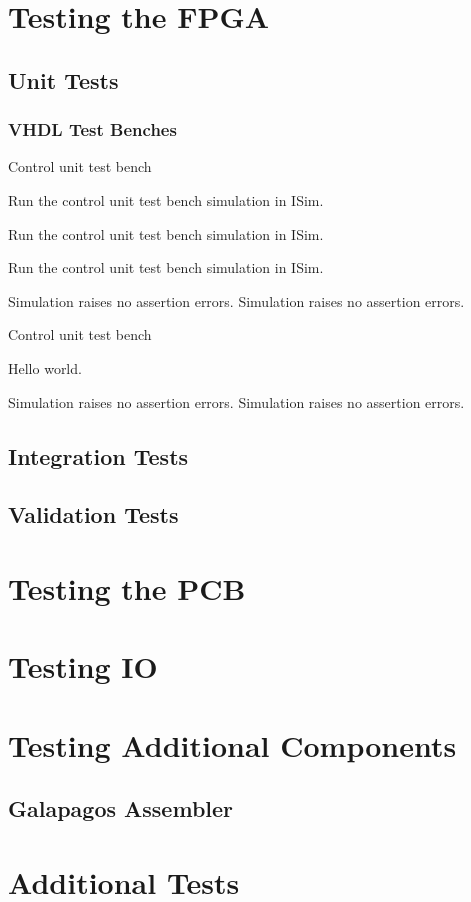 \section{Testing the FPGA}

\subsection{Unit Tests}


\subsubsection{VHDL Test Benches}

\test
{Control unit test bench}{
    \item{Run the control unit test bench simulation in ISim.}
    \item{Run the control unit test bench simulation in ISim.}
    \item{Run the control unit test bench simulation in ISim.}
}{Simulation raises no assertion errors.}
{Simulation raises no assertion errors.}

\test
{Control unit test bench}
{
\item{Hello world.}
}
{Simulation raises no assertion errors.}
{Simulation raises no assertion errors.}

\subsection{Integration Tests}

\subsection{Validation Tests}

\section{Testing the PCB}

\section{Testing IO}

\section{Testing Additional Components}

\subsection{Galapagos Assembler}


\section{Additional Tests}

